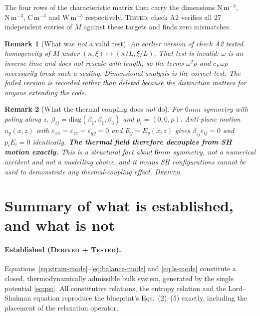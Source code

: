 \documentclass[11pt]{article}
\newcommand{\eps}{\varepsilon}
\theoremstyle{plain}
\newtheorem{remark}{Remark}
\begin{document}
The four rows of the characteristic matrix then carry the dimensions
$\mathrm{N\,m^{-3}}$, $\mathrm{N\,m^{-3}}$, $\mathrm{C\,m^{-3}}$ and
$\mathrm{W\,m^{-3}}$ respectively. \textsc{Tested}: check A2 verifies all 27
independent entries of $M$ against these targets and finds zero mismatches.

\begin{remark}[What was \emph{not} a valid test]
An earlier version of check A2 tested homogeneity of $M$ under
$(\kappa,\xi)\mapsto(\kappa/L,\xi/L)$. That test is invalid: $\omega$ is an
inverse time and does not rescale with length, so the terms $\omega^2\rho$ and
$c_E\omega\rho$ necessarily break such a scaling. Dimensional analysis is the
correct test. The failed version is recorded rather than deleted because the
distinction matters for anyone extending the code.
\end{remark}

\begin{remark}[What the thermal coupling does \emph{not} do]
\label{rem:sh}
For $6mm$ symmetry with poling along $z$, $\beta_{ij}=\mathrm{diag}(\beta_1,\beta_1,\beta_3)$
and $p_i=(0,0,p)$. Anti-plane motion $u_y(x,z)$ with $\eps_{xx}=\eps_{zz}=\eps_{yy}=0$
and $E_y=E_y(x,z)$ gives $\beta_{ij}\eps_{ij}=0$ and $p_iE_i = 0$ identically.
\textbf{The thermal field therefore decouples from SH motion exactly.} This is a
structural fact about $6mm$ symmetry, not a numerical accident and not a
modelling choice, and it means SH configurations cannot be used to demonstrate any
thermal-coupling effect. \textsc{Derived}.
\end{remark}

\section{Summary of what is established, and what is not}
\label{sec:summary}

\paragraph{Established (\textsc{Derived} + \textsc{Tested}).}
Equations~\eqref{eq:strain-mode}--\eqref{eq:balance-mode} and \eqref{eq:ls-mode}
constitute a closed, thermodynamically admissible bulk system, generated by the
single potential \eqref{eq:psi}. All constitutive relations, the entropy relation
and the Lord--Shulman equation reproduce the blueprint's Eqs.~(2)--(5) exactly,
including the placement of the relaxation operator.
\end{document}

